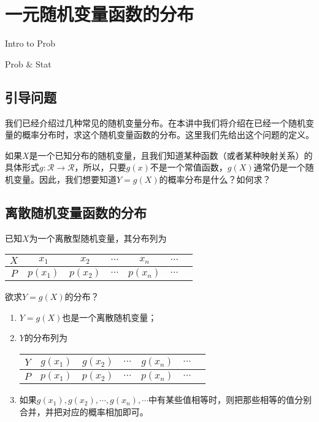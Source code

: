 \chapter{一元随机变量函数的分布}
\begin{introduction}
  \item Intro to Prob
  \item Prob $ \& $ Stat
\end{introduction}

\section{引导问题}
我们已经介绍过几种常见的随机变量分布。在本讲中我们将介绍在已经一个随机变量的概率分布时，求这个随机变量函数的分布。这里我们先给出这个问题的定义。
\begin{problem}
如果$X$是一个已知分布的随机变量，且我们知道某种函数（或者某种映射关系）的具体形式$g: \mathcal{R} \rightarrow \mathcal{R} $，所以，只要$g(x)$不是一个常值函数，$g(X)$通常仍是一个随机变量。因此，我们想要知道$Y = g(X)$的概率分布是什么？如何求？
\end{problem}


\section{离散随机变量函数的分布}
已知$X$为一个离散型随机变量，其分布列为
\begin{table}[htbp]
  \centering
  \begin{tabular}{c|cccccc}

    $X$
    & $x_{1}$
    & $x_{2}$
    & $\cdots$
    & $x_{n}$
    & $\cdots$\\
  \midrule
    $P$ & $p(x_{1})$
    & $p(x_{2})$
    & $\cdots$
    & $p(x_{n})$
    & $\cdots$\\

  \end{tabular}
\end{table}
欲求$Y=g(X)$的分布？
\begin{enumerate}
    \item $Y = g(X)$也是一个离散随机变量；
    \item $Y$的分布列为
    \begin{table}[htbp]
  \centering
  \begin{tabular}{c|cccccc}
    $Y$
    & $g(x_{1})$
    & $g(x_{2})$
    & $\cdots$
    & $g(x_{n})$
    & $\cdots$\\
  \midrule
    $P$ & $p(x_{1})$
    & $p(x_{2})$
    & $\cdots$
    & $p(x_{n})$
    & $\cdots$\\
  \end{tabular}
\end{table}
\item 如果$g(x_{1}),g(x_{2}),\cdots,g(x_{n}),\cdots$中有某些值相等时，则把那些相等的值分别合并，并把对应的概率相加即可。
\end{enumerate}


